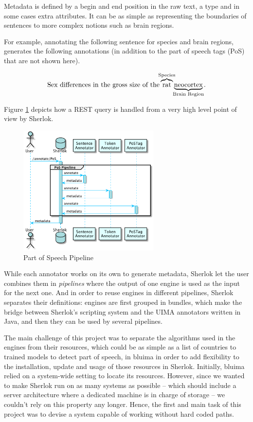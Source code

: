 \documentclass{article}
\begin{document}
Metadata is defined by a begin and end position in the raw text, a type and in some cases extra
attributes. It can be as simple as representing the boundaries of sentences to more complex notions
such as brain regions.

For example, annotating the following sentence for species and brain regions, generates the
following annotations (in addition to the part of speech tags (PoS) that are not shown here).

\[
    \text{Sex differences in the gross size of the}
    \overbrace{\text{rat}}^{\mathclap{\text{Species}}}
    \underbrace{\text{neocortex}}_{\mathclap{\text{Brain Region}}} \text{.}
\]

Figure \ref{fig:sherlok_basic_rest_call} depicts how a REST query is handled from a very high level
point of view by Sherlok.

\begin{figure}
    \centering
    \includegraphics[width=200pt]{res/sherlok_basic_rest_call.png}
    \caption{Part of Speech Pipeline}
    \label{fig:sherlok_basic_rest_call}
\end{figure}

While each annotator works on its own to generate metadata, Sherlok let the user combines them in
\emph{pipelines} where the output of one engine is used as the input for the next one. And in order
to reuse engines in different pipelines, Sherlok separates their definitions: engines are first
grouped in bundles, which make the bridge between Sherlok's scripting system and the UIMA annotators
written in Java, and then they can be used by several pipelines.

The main challenge of this project was to separate the algorithms used in the engines from their
resources, which could be as simple as a list of countries to trained models to detect part of
speech, in bluima in order to add flexibility to the installation, update and usage of those
resources in Sherlok.  Initially, bluima relied on a system-wide setting to locate its resources.
However, since we wanted to make Sherlok run on as many systems as possible -- which should include
a server architecture where a dedicated machine is in charge of storage -- we couldn't rely on this
property any longer.  Hence, the first and main task of this project was to devise a system capable
of working without hard coded paths.
\end{document}
